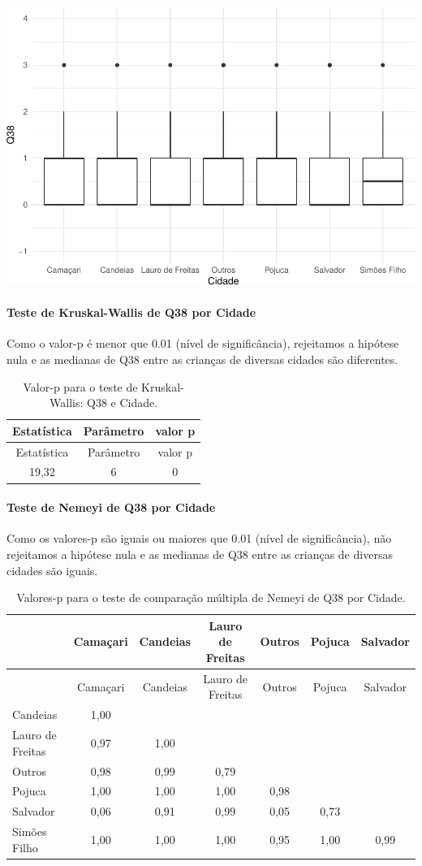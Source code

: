 \documentclass[]{article}
\let\oldparagraph\paragraph
\renewcommand{\paragraph}[1]{\oldparagraph{#1}\mbox{}}
\begin{document}
\begin{center}\includegraphics[width=0.75\linewidth]{relatorio_covid19_files/figure-latex/unnamed-chunk-1433-1} \end{center}

\hypertarget{teste-de-kruskal-wallis-de-q38-por-cidade}{%
\paragraph{Teste de Kruskal-Wallis de Q38 por Cidade}\label{teste-de-kruskal-wallis-de-q38-por-cidade}}

Como o valor-p é menor que 0.01 (nível de significância), rejeitamos a hipótese nula e as medianas de Q38 entre as crianças de diversas cidades são diferentes.

\begin{longtable}[]{@{}ccc@{}}
\caption{\label{tab:unnamed-chunk-1435}Valor-p para o teste de Kruskal-Wallis: Q38 e Cidade.}\tabularnewline
\toprule
Estatística & Parâmetro & valor p\tabularnewline
\midrule
\endfirsthead
\toprule
Estatística & Parâmetro & valor p\tabularnewline
\midrule
\endhead
19,32 & 6 & 0\tabularnewline
\bottomrule
\end{longtable}

\hypertarget{teste-de-nemeyi-de-q38-por-cidade}{%
\paragraph{Teste de Nemeyi de Q38 por Cidade}\label{teste-de-nemeyi-de-q38-por-cidade}}

Como os valores-p são iguais ou maiores que 0.01 (nível de significância), não rejeitamos a hipótese nula e as medianas de Q38 entre as crianças de diversas cidades são iguais.

\begin{longtable}[]{@{}lcccccc@{}}
\caption{\label{tab:unnamed-chunk-1437}Valores-p para o teste de comparação múltipla de Nemeyi de Q38 por Cidade.}\tabularnewline
\toprule
& Camaçari & Candeias & Lauro de Freitas & Outros & Pojuca & Salvador\tabularnewline
\midrule
\endfirsthead
\toprule
& Camaçari & Candeias & Lauro de Freitas & Outros & Pojuca & Salvador\tabularnewline
\midrule
\endhead
Candeias & 1,00 & & & & &\tabularnewline
Lauro de Freitas & 0,97 & 1,00 & & & &\tabularnewline
Outros & 0,98 & 0,99 & 0,79 & & &\tabularnewline
Pojuca & 1,00 & 1,00 & 1,00 & 0,98 & &\tabularnewline
Salvador & 0,06 & 0,91 & 0,99 & 0,05 & 0,73 &\tabularnewline
Simões Filho & 1,00 & 1,00 & 1,00 & 0,95 & 1,00 & 0,99\tabularnewline
\bottomrule
\end{longtable}
\end{document}
